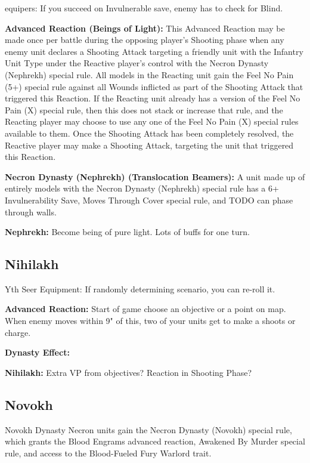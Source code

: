 \begin{multicols}{2}
equipers: If you succeed on Invulnerable save, enemy has to check for Blind.

\textbf{Advanced Reaction (Beings of Light):} This Advanced Reaction may be made once per battle during the opposing player’s Shooting phase when any enemy unit declares a Shooting Attack targeting a friendly unit with the Infantry Unit Type under the Reactive player’s control with the Necron Dynasty (Nephrekh) special rule. All models in the Reacting unit gain the Feel No Pain (5+) special rule against all Wounds inflicted as part of the Shooting Attack that triggered this Reaction. If the Reacting unit already has a version of the Feel No Pain (X) special rule, then this does not stack or increase that rule, and the Reacting player may choose to use any one of the Feel No Pain (X) special rules available to them. Once the Shooting Attack has been completely resolved, the Reactive player may make a Shooting Attack, targeting the unit that triggered this Reaction.

\textbf{Necron Dynasty (Nephrekh) (Translocation Beamers):} A unit made up of entirely models with the Necron Dynasty (Nephrekh) special rule has a 6+ Invulnerability Save, Moves Through Cover special rule, and TODO can phase through walls.

\textbf{Nephrekh:} Become being of pure light. Lots of buffs for one turn.


\newpage
\subsection{Nihilakh}

Yth Seer Equipment: If randomly determining scenario, you can re-roll it.

\textbf{Advanced Reaction:} Start of game choose an objective or a point on map. When enemy moves within 9" of this, two of your units get to make a shoots or charge.

\textbf{Dynasty Effect:}

\textbf{Nihilakh:} Extra VP from objectives? Reaction in Shooting Phase?


\newpage
\subsection{Novokh}

Novokh Dynasty Necron units gain the Necron Dynasty (Novokh) special rule, which grants the Blood Engrams advanced reaction, Awakened By Murder special rule, and access to the Blood-Fueled Fury Warlord trait.


\end{multicols}
